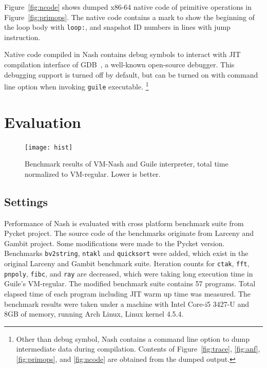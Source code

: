 \documentclass[preprint, 10pt]{sigplanconf}
\begin{document}
Figure~\hyperref[fig:ncode]{\ref{fig:ncode}} shows dumped x86-64 native code
of primitive operations in
Figure~\hyperref[fig:primops]{\ref{fig:primops}}. The native code contains a
mark to show the beginning of the loop body with \texttt{loop:}, and snapshot
ID numbers in lines with jump instruction.

Native code compiled in Nash contains debug symbols to interact with JIT
compilation interface of GDB~\cite{stallman2002debugging}, a well-known
open-source debugger. This debugging support is turned off by default, but can
be turned on with command line option when invoking \texttt{guile} executable.
\footnote{Other than debug symbol, Nash contains a command line option to dump
  intermediate data during compilation. Contents of
  Figure~\hyperref[fig:anf]{\ref{fig:trace}},
  \hyperref[fig:anf]{\ref{fig:anf}},
  \hyperref[fig:primops]{\ref{fig:primops}}, and
  \hyperref[fig:ncode]{\ref{fig:ncode}} are obtained from the dumped output.}

\section{Evaluation}
\label{sec:evaluation}

\begin{figure}
  \centering
  \texttt{[image: hist]}
  \caption{Benchmark results of VM-Nash and Guile interpreter, total time
    normalized to VM-regular. Lower is better.}
  \label{fig:bench}
\end{figure}

\subsection{Settings}

Performance of Nash is evaluated with cross platform benchmark suite from
Pycket project. The source code of the benchmarks originate from Larceny and
Gambit project. Some modifications were made to the Pycket version. Benchmarks
\texttt{bv2string}, \texttt{ntakl} and \texttt{quicksort} were added, which
exist in the original Larceny and Gambit benchmark suite. Iteration counts for
\texttt{ctak}, \texttt{fft}, \texttt{pnpoly}, \texttt{fibc}, and \texttt{ray}
are decreased, which were taking long execution time in Guile's
VM-regular. The modified benchmark suite contains 57 programs. Total elapsed
time of each program including JIT warm up time was measured. The benchmark
results were taken under a machine with Intel Core-i5 3427-U and 8GB of
memory, running Arch Linux, Linux kernel 4.5.4.
\end{document}
